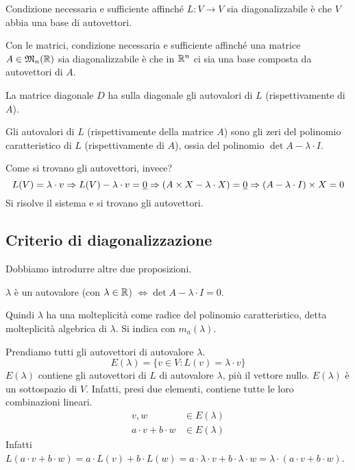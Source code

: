 \begin{prop}
Condizione necessaria e sufficiente affinch\'e $L : V \to V$ sia diagonalizzabile \`e che $V$ abbia una base di autovettori.

Con le matrici, condizione necessaria e sufficiente affinch\'e una matrice $A \in \mathfrak{M}_{n} (\mathbb{R})$ sia diagonalizzabile \`e che in $\mathbb{R}^n$ ci sia una base composta da autovettori di $A$.
\end{prop}
La matrice diagonale $D$ ha sulla diagonale gli autovalori di $L$ (rispettivamente di $A$).

\begin{prop}
Gli autovalori di $L$ (rispettivamente della matrice $A$) sono gli zeri del polinomio caratteristico di $L$ (rispettivamente di $A$), ossia del polinomio $\det{A - \lambda \cdot I}$.
\end{prop}

Come si trovano gli autovettori, invece?
\[
L(V) = \lambda \cdot v \Rightarrow L(V) - \lambda \cdot v = \underline{0} \Rightarrow 
(A \times X - \lambda \cdot X) = \underline{0} \Rightarrow (A - \lambda \cdot I) \times X = 0
\]
Si risolve il sistema e si trovano gli autovettori.

\subsection{Criterio di diagonalizzazione}

Dobbiamo introdurre altre due proposizioni.

$\lambda$ \`e un autovalore (con $\lambda \in \mathbb{R}$) $\iff \det{A - \lambda \cdot I} = 0$.

Quindi $\lambda$ ha una molteplicit\`a come radice del polinomio caratteristico, detta molteplicit\`a algebrica di $\lambda$. Si indica con $m_a(\lambda)$.

Prendiamo tutti gli autovettori di autovalore $\lambda$.
\[
E(\lambda) = \{ v \in V : L(v) = \lambda \cdot v \}
\]
$E(\lambda)$ contiene gli autovettori di $L$ di autovalore $\lambda$, pi\`u il vettore nullo. $E(\lambda)$ \`e un sottospazio di $V$. Infatti, presi due elementi, contiene tutte le loro combinazioni lineari.
\begin{align*}
v, w &\in E(\lambda) \\
a \cdot v + b \cdot w &\in E(\lambda)
\end{align*}
Infatti $L(a \cdot v + b \cdot w) = a \cdot L(v) + b \cdot L(w) = 
a \cdot \lambda \cdot v + b \cdot \lambda \cdot w =
\lambda \cdot (a \cdot v + b \cdot w)$.

